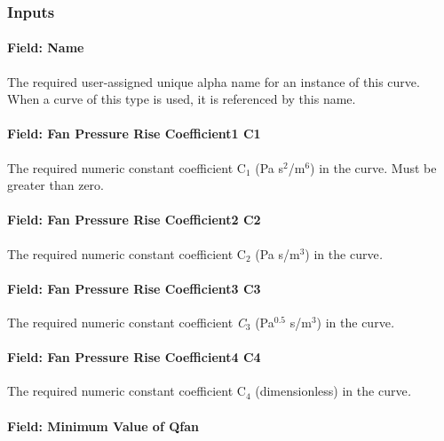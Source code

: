 \subsubsection{Inputs}\label{inputs-12-010}

\paragraph{Field: Name}\label{field-name-12-007}

The required user-assigned unique alpha name for an instance of this curve. When a curve of this type is used, it is referenced by this name.

\paragraph{Field: Fan Pressure Rise Coefficient1 C1}\label{field-fan-pressure-rise-coefficient1-c1}

The required numeric constant coefficient C\emph{\(_{1}\)} (Pa s\(^{2}\)/m\(^{6}\)) in the curve. Must be greater than zero.

\paragraph{Field: Fan Pressure Rise Coefficient2 C2}\label{field-fan-pressure-rise-coefficient2-c2}

The required numeric constant coefficient C\emph{\(_{2}\)} (Pa s/m\(^{3}\)) in the curve\emph{.}

\paragraph{Field: Fan Pressure Rise Coefficient3 C3}\label{field-fan-pressure-rise-coefficient3-c3}

The required numeric constant coefficient \emph{C\(_{3}\)} (Pa\(^{0.5}\) s/m\(^{3}\)) in the curve\emph{.}

\paragraph{Field: Fan Pressure Rise Coefficient4 C4}\label{field-fan-pressure-rise-coefficient4-c4}

The required numeric constant coefficient C\emph{\(_{4}\)} (dimensionless) in the curve\emph{.}

\paragraph{Field: Minimum Value of Qfan}\label{field-minimum-value-of-qfan}

